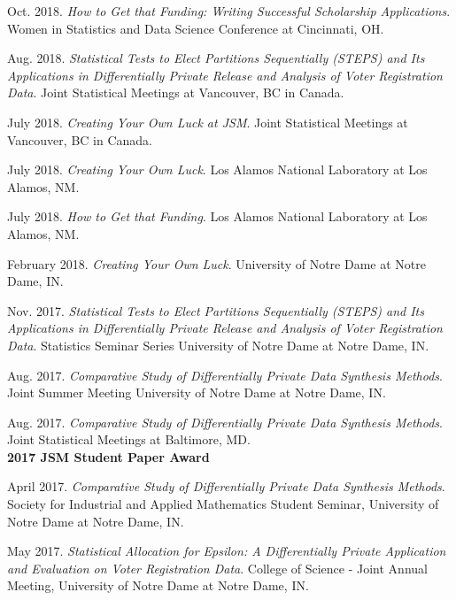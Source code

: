 \documentclass[11pt, letterpaper, roman]{moderncv} %
\begin{document}
\begin{etaremune}[topsep=0pt, itemsep=6pt, partopsep=0pt, parsep=0pt]
  \item Oct. 2018. \textit{How to Get that Funding: Writing Successful Scholarship Applications}. Women in Statistics and Data Science Conference at Cincinnati, OH.

  \item Aug. 2018. \textit{Statistical Tests to Elect Partitions Sequentially (STEPS) and Its Applications in Differentially Private Release and Analysis of Voter Registration Data}. Joint Statistical Meetings at Vancouver, BC in Canada.
  
  \item July 2018. \textit{Creating Your Own Luck at JSM}. Joint Statistical Meetings at Vancouver, BC in Canada.
  
  \item July 2018. \textit{Creating Your Own Luck}. Los Alamos National Laboratory at Los Alamos, NM.
  
  \item July 2018. \textit{How to Get that Funding}. Los Alamos National Laboratory at Los Alamos, NM.
  
  \item February 2018. \textit{Creating Your Own Luck}. University of Notre Dame at Notre Dame, IN.
  
  \item Nov. 2017. \textit{Statistical Tests to Elect Partitions Sequentially (STEPS) and Its Applications in Differentially Private Release and Analysis of Voter Registration Data}. Statistics Seminar Series University of Notre Dame at Notre Dame, IN.
  
  \item Aug. 2017. \textit{Comparative Study of Differentially Private Data Synthesis Methods}. Joint Summer Meeting University of Notre Dame at Notre Dame, IN.

  \item Aug. 2017. \textit{Comparative Study of Differentially Private Data Synthesis Methods}. Joint Statistical Meetings at Baltimore, MD.\\
  \textbf{2017 JSM Student Paper Award}
  
   \item April 2017. \textit{Comparative Study of Differentially Private Data Synthesis Methods}. Society for Industrial and Applied Mathematics Student Seminar, University of Notre Dame at Notre Dame, IN.
  
  \item May 2017. \textit{Statistical Allocation for Epsilon: A Differentially Private Application and Evaluation on Voter Registration Data}. College of Science - Joint Annual Meeting, University of Notre Dame at Notre Dame, IN.


\end{etaremune}
\end{document}
